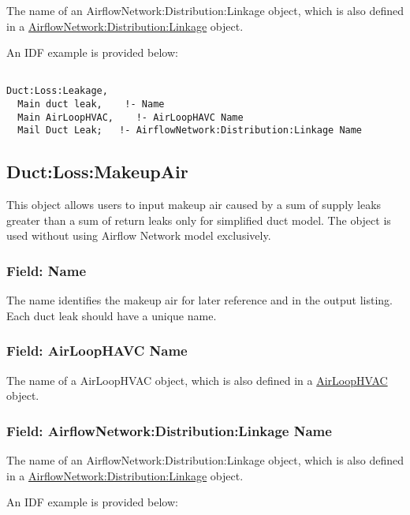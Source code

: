 The name of an AirflowNetwork:Distribution:Linkage object, which is also defined in a \hyperref[airflownetworkdistributionlinkage]{AirflowNetwork:Distribution:Linkage} object.

An IDF example is provided below:

\begin{lstlisting}

Duct:Loss:Leakage,
  Main duct leak,    !- Name
  Main AirLoopHVAC,    !- AirLoopHAVC Name
  Mail Duct Leak;   !- AirflowNetwork:Distribution:Linkage Name

\end{lstlisting}

\subsection{Duct:Loss:MakeupAir}\label{ductlossmakeupair}

This object allows users to input makeup air caused by a sum of supply leaks greater than a sum of return leaks only for simplified duct model. The object is used without using Airflow Network model exclusively. 

\subsubsection{Field: Name}\label{duct-leakage-field-name-duct-000}

The name identifies the makeup air for later reference and in the output listing. Each duct leak should have a unique name.

\subsubsection{Field: AirLoopHAVC Name}\label{duct-leakage-airloophavcname}

The name of a AirLoopHVAC object, which is also defined in a \hyperref[airloophvac]{AirLoopHVAC} object.

\subsubsection{Field: AirflowNetwork:Distribution:Linkage Name}\label{airflownetworkdistributionlinkagename}

The name of an AirflowNetwork:Distribution:Linkage object, which is also defined in a \hyperref[airflownetworkdistributionlinkage]{AirflowNetwork:Distribution:Linkage} object.

An IDF example is provided below:

